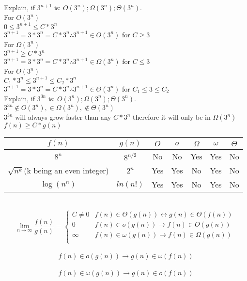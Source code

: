 \documentclass[12pt,largemargins]{homework}
\date{September 6, 2018}
\begin{document}
\maketitle
\question
Explain, if $3^{n + 1}$ is: $ O(3^n ) ; \Omega ( 3^n ) ; \Theta ( 3^n ) $.\\
For $O(3^n)$\\
$ 0\leq 3^{n+1} \leq C*3^n$ \\
$3^{n+1} = 3*3^n = C * 3^n \therefore 3^{n+1} \in O(3^n)$ for $ C\geq 3 $\\
For $\Omega (3^n)$\\
$3^{n+1} \geq C*3^n$\\
$3^{n+1} = 3*3^n = C * 3^n \therefore 3^{n+1} \in \Omega(3^n)$ for $ C\leq 3 $\\
For $\Theta (3^n)$\\
$C_1 * 3^n \leq 3^{n+1} \leq C_2*3^n$\\
$3^{n+1} = 3*3^n = C * 3^n \therefore 3^{n+1} \in \Theta(3^n)$ for $ C_1 \leq 3 \leq C_2$\\
\question
Explain, if $3^{3 n}$ is: $ O ( 3^n ) ; \Omega ( 3^n ) ; \Theta ( 3^n ).$\\
$3^{3n} \notin O(3^n), \in \Omega(3^n), \notin \Theta(3^n)$\\
$3^{3n}$ will always grow faster than any $C * 3^n$ therefore it will only be in $\Omega(3^n)$ $f(n)\geq C*g(n)$\\
\newpage
\question
\begin{tabular}{|c|c|c|c|c|c|c|}
\hline
$f(n)$&$g(n)$&$O$&$o$&$\Omega$&$\omega$&$\Theta$\\
\hline
$8^n$&$8^{n/2}$&No&No&Yes&Yes&No\\
\hline
$\sqrt{n^k} $(k being an even integer)$ $&$2^n$&Yes& Yes&No&Yes&No\\
\hline
$\log(n^n)$&$ln(n!)$&Yes&Yes&No&Yes&No\\
\hline
\end{tabular}\\
$$\lim_{n\to\infty}\frac{f(n)}{g(n)}=
\begin{cases} 
      C \neq 0 & f(n) \in \Theta(g(n)) \leftrightarrow g(n) \in \Theta(f(n))\\
      0 & f(n) \in o(g(n)) \rightarrow f(n) \in O(g(n))\\
      \infty & f(n) \in \omega(g(n)) \rightarrow f(n) \in \Omega(g(n))\\
   \end{cases}
\,$$\\
$$ f(n) \in o(g(n)) \rightarrow g(n) \in \omega(f(n)) $$\\
$$f(n) \in \omega(g(n)) \rightarrow g(n) \in o(f(n))$$\\
\end{document}
